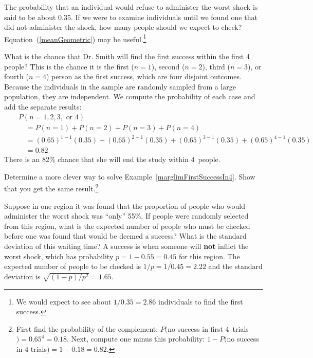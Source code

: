 
\begin{exercise}
The probability that an individual would refuse to administer the worst shock is said to be about 0.35. If we were to examine individuals until we found one that did not administer the shock, how many people should we expect to check? %
Equation~(\ref{meanGeometric}) may be useful.\footnote{We would expect to see about $1/0.35 = 2.86$ individuals to find the first success.}
\end{exercise}

\begin{example}{What is the chance that Dr. Smith will find the first success within the first 4 people?} \label{marglimFirstSuccessIn4}
This is the chance it is the first ($n=1$), second ($n=2$), third ($n=3$), or fourth ($n=4$) person as the first success, which are four disjoint outcomes. Because the individuals in the sample are randomly sampled from a large population, they are independent. We compute the probability of each case and add the separate results:
\begin{eqnarray*}
&&P(n=1, 2, 3,\text{ or }4) \\
	&& \quad = P(n=1)+P(n=2)+P(n=3)+P(n=4) \\
	&& \quad = (0.65)^{1-1}(0.35) + (0.65)^{2-1}(0.35) + (0.65)^{3-1}(0.35) + (0.65)^{4-1}(0.35) \\
	&& \quad = 0.82
\end{eqnarray*}
There is an 82\% chance that she will end the study within 4~people.
\end{example}

\begin{exercise}
Determine a more clever way to solve Example~\ref{marglimFirstSuccessIn4}. Show that you get the same result.\footnote{First find the probability of the complement: $P($no success in first 4~trials$) = 0.65^4 = 0.18$. Next, compute one minus this probability: $1-P($no success in 4 trials$) = 1-0.18 = 0.82$.}
\end{exercise}

\begin{example}{Suppose in one region it was found that the proportion of people who would administer the worst shock was ``only'' 55\%. If people were randomly selected from this region, what is the expected number of people who must be checked before one was found that would be deemed a success? What is the standard deviation of this waiting time?} \label{onlyShocking55PercOfTheTimeExample}
A success is when someone will \textbf{not} inflict the worst shock, which has probability $p=1-0.55=0.45$ for this region. The expected number of people to be checked is $1/p = 1/0.45 = 2.22$ and the standard deviation is $\sqrt{(1-p)/p^2} = 1.65$.
\end{example}


